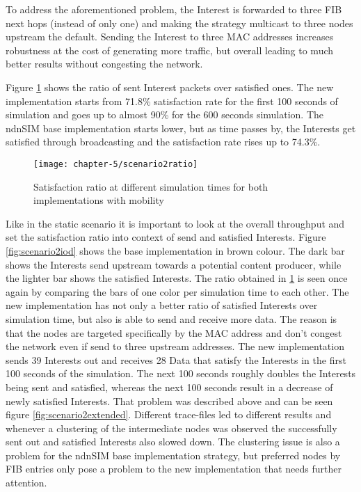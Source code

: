To address the aforementioned problem, the Interest is forwarded to three FIB next hops (instead of only one) and making the strategy multicast to three nodes upstream the default. Sending the Interest to three MAC addresses increases robustness at the cost of generating more traffic, but overall leading to much better results without congesting the network.

Figure \ref{fig:scenario2ratio} shows the ratio of sent Interest packets over satisfied ones. The new implementation starts from 71.8\% satisfaction rate for the first 100 seconds of simulation and goes up to almost 90\% for the 600 seconds simulation. The ndnSIM base implementation starts lower, but as time passes by, the Interests get satisfied through broadcasting and the satisfaction rate rises up to 74.3\%.

\begin{figure}[H]
  \centering
  \texttt{[image: chapter-5/scenario2ratio]}
  \caption{Satisfaction ratio at different simulation times for both implementations with mobility}
  \label{fig:scenario2ratio}
\end{figure}

\vspace{5mm} %

Like in the static scenario it is important to look at the overall throughput and set the satisfaction ratio into context of send and satisfied Interests. Figure \ref{fig:scenario2iod} shows the base implementation in brown colour. The dark bar shows the Interests send upstream towards a potential content producer, while the lighter bar shows the satisfied Interests. The ratio obtained in \ref{fig:scenario2ratio} is seen once again by comparing the bars of one color per simulation time to each other. The new implementation has not only a better ratio of satisfied Interests over simulation time, but also is able to send and receive more data. The reason is that the nodes are targeted specifically by the MAC address and don't congest the network even if send to three upstream addresses.
The new implementation sends 39 Interests out and receives 28 Data that satisfy the Interests in the first 100 seconds of the simulation. The next 100 seconds roughly doubles the Interests being sent and satisfied, whereas the next 100 seconds result in a decrease of newly satisfied Interests. That problem was described above and can be seen figure \ref{fig:scenario2extended}. Different trace-files led to different results and whenever a clustering of the intermediate nodes was observed the successfully sent out and satisfied Interests also slowed down. The clustering issue is also a problem for the ndnSIM base implementation strategy, but preferred nodes by FIB entries only pose a problem to the new implementation that needs further attention.

